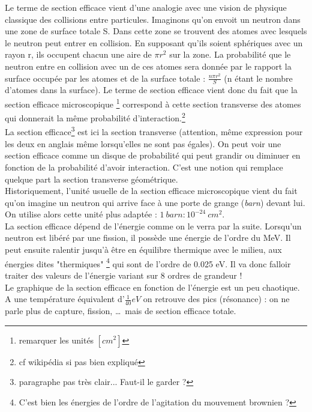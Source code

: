 Le terme de section efficace vient d'une analogie avec une vision de physique classique des collisions entre particules.
Imaginons qu'on envoit un neutron dans une zone de surface totale S. Dans cette zone se trouvent des atomes
avec lesquels le neutron peut entrer en collision. En supposant qu'ils soient sphériques avec un rayon r, ils occupent
chacun une aire de $\pi r^2$ sur la zone. La probabilité que le neutron entre en collision avec un de ces atomes sera
donnée par le rapport la surface occupée par les atomes et de la surface totale : $\frac{n \pi r^2}{S}$ (n étant le
nombre d'atomes dans la surface). Le terme de section efficace vient donc du fait que la section efficace microscopique
\footnote{remarquer les unités $[cm^{2}]$} correspond à cette section transverse des atomes qui donnerait la même probabilité
d'interaction.\footnote{cf wikipédia si pas bien expliqué}\\

La section efficace\footnote{paragraphe pas très clair... Faut-il le garder ?} est ici la section transverse (attention, même expression pour les deux en 
anglais même lorsqu'elles ne sont pas égales). On peut voir une section efficace comme un disque 
de probabilité qui peut grandir ou diminuer en fonction de la probabilité d'avoir interaction. C'est 
une notion qui remplace quelque part la section transverse géométrique.\\

Historiquement, l'unité usuelle de la section efficace microscopique vient du fait qu'on imagine 
un neutron qui arrive face à une porte de grange (\textit{barn}) 
devant lui. On utilise alors cette unité plus adaptée : $1\ barn : 10^{-24}\ cm^2$.\\

La section efficace dépend de l'énergie comme on le verra par la suite.
Lorsqu'un neutron est libéré par une fission, il possède une énergie de l'ordre du MeV.
Il peut ensuite ralentir jusqu'à être en équilibre thermique avec le milieu, aux énergies dites 
"thermiques" \footnote{C'est bien les énergies de l'ordre de l'agitation du mouvement brownien ?} qui
sont de l'ordre de 0.025 eV. Il va donc falloir traiter des valeurs de l'énergie variant sur 8 ordres
de grandeur !\\

Le graphique de la section efficace en fonction de l'énergie est un peu chaotique. A une température 
équivalent d'$\frac{1}{40}eV$ on retrouve des pics (résonance) : on ne parle plus de capture, 
fission, \dots \ mais de section efficace totale.\\

